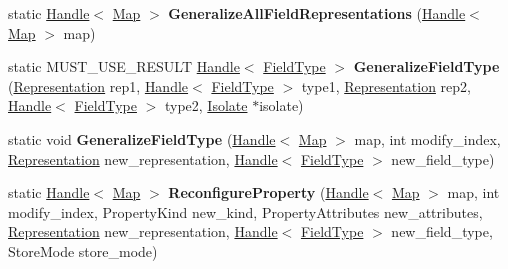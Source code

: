 \begin{DoxyCompactItemize}
\item 
static \hyperlink{classv8_1_1internal_1_1_handle}{Handle}$<$ \hyperlink{classv8_1_1internal_1_1_map}{Map} $>$ {\bfseries Generalize\+All\+Field\+Representations} (\hyperlink{classv8_1_1internal_1_1_handle}{Handle}$<$ \hyperlink{classv8_1_1internal_1_1_map}{Map} $>$ map)\hypertarget{classv8_1_1internal_1_1_map_a8ff46868ab15d0821681329c69020a5c}{}\label{classv8_1_1internal_1_1_map_a8ff46868ab15d0821681329c69020a5c}

\item 
static M\+U\+S\+T\+\_\+\+U\+S\+E\+\_\+\+R\+E\+S\+U\+LT \hyperlink{classv8_1_1internal_1_1_handle}{Handle}$<$ \hyperlink{classv8_1_1internal_1_1_field_type}{Field\+Type} $>$ {\bfseries Generalize\+Field\+Type} (\hyperlink{classv8_1_1internal_1_1_representation}{Representation} rep1, \hyperlink{classv8_1_1internal_1_1_handle}{Handle}$<$ \hyperlink{classv8_1_1internal_1_1_field_type}{Field\+Type} $>$ type1, \hyperlink{classv8_1_1internal_1_1_representation}{Representation} rep2, \hyperlink{classv8_1_1internal_1_1_handle}{Handle}$<$ \hyperlink{classv8_1_1internal_1_1_field_type}{Field\+Type} $>$ type2, \hyperlink{classv8_1_1internal_1_1_isolate}{Isolate} $\ast$isolate)\hypertarget{classv8_1_1internal_1_1_map_ab2e7d01d3a623864d5e49a316eaeb904}{}\label{classv8_1_1internal_1_1_map_ab2e7d01d3a623864d5e49a316eaeb904}

\item 
static void {\bfseries Generalize\+Field\+Type} (\hyperlink{classv8_1_1internal_1_1_handle}{Handle}$<$ \hyperlink{classv8_1_1internal_1_1_map}{Map} $>$ map, int modify\+\_\+index, \hyperlink{classv8_1_1internal_1_1_representation}{Representation} new\+\_\+representation, \hyperlink{classv8_1_1internal_1_1_handle}{Handle}$<$ \hyperlink{classv8_1_1internal_1_1_field_type}{Field\+Type} $>$ new\+\_\+field\+\_\+type)\hypertarget{classv8_1_1internal_1_1_map_a8b10226b6830c5d3a43affe72034d21f}{}\label{classv8_1_1internal_1_1_map_a8b10226b6830c5d3a43affe72034d21f}

\item 
static \hyperlink{classv8_1_1internal_1_1_handle}{Handle}$<$ \hyperlink{classv8_1_1internal_1_1_map}{Map} $>$ {\bfseries Reconfigure\+Property} (\hyperlink{classv8_1_1internal_1_1_handle}{Handle}$<$ \hyperlink{classv8_1_1internal_1_1_map}{Map} $>$ map, int modify\+\_\+index, Property\+Kind new\+\_\+kind, Property\+Attributes new\+\_\+attributes, \hyperlink{classv8_1_1internal_1_1_representation}{Representation} new\+\_\+representation, \hyperlink{classv8_1_1internal_1_1_handle}{Handle}$<$ \hyperlink{classv8_1_1internal_1_1_field_type}{Field\+Type} $>$ new\+\_\+field\+\_\+type, Store\+Mode store\+\_\+mode)\hypertarget{classv8_1_1internal_1_1_map_a59ec3a3d1214300a5f5f809b819ed091}{}\label{classv8_1_1internal_1_1_map_a59ec3a3d1214300a5f5f809b819ed091}


\end{DoxyCompactItemize}
